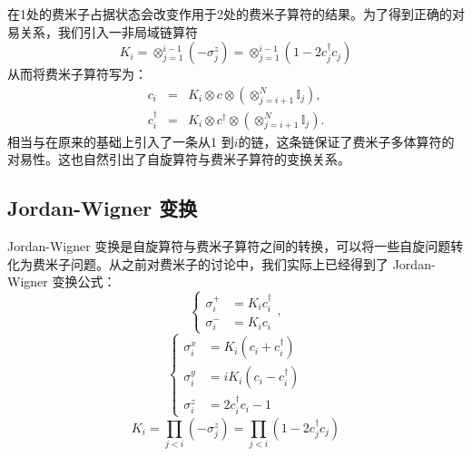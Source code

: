 \documentclass[10pt,UTF8]{ctexart}
\begin{document}
在1处的费米子占据状态会改变作用于2处的费米子算符的结果。为了得到正确的对易关系，我们引入一非局域链算符
\begin{equation}
	K_{i}=\otimes_{j=1}^{i-1}\left(-\sigma_{j}^{z}\right)=\otimes_{j=1}^{i-1}\left(1-2c_{j}^{\dagger}c_{j}\right) 
\end{equation}
从而将费米子算符写为：
\begin{eqnarray}
	c_{i}&=&K_{i}\otimes c\otimes\left(\otimes_{j=i+1}^{N}\mathbb{I}_{j}\right), \\
	c_{i}^{\dagger}&=&K_{i}\otimes c^{\dagger}\otimes\left(\otimes_{j=i+1}^{N}\mathbb{I}_{j}\right).
\end{eqnarray}
相当与在原来的基础上引入了一条从1 到$i$的链，这条链保证了费米子多体算符的对易性。这也自然引出了自旋算符与费米子算符的变换关系。

\subsection*{Jordan-Wigner 变换}
\noindent Jordan-Wigner 变换是自旋算符与费米子算符之间的转换，可以将一些自旋问题转化为费米子问题。从之前对费米子的讨论中，我们实际上已经得到了 Jordan-Wigner 变换公式：
\begin{equation}
	\begin{cases} \sigma_{i}^{+} & =K_{i}c_{i}^{\dagger}\\ \sigma_{i}^{-} & =K_{i}c_{i} \end{cases},
\end{equation}
\begin{equation}
	\begin{cases} \sigma_{i}^{x} & =K_{i}\left(c_{i}+c_{i}^{\dagger}\right)\\ \sigma_{i}^{y} & =iK_{i}\left(c_{i}-c_{i}^{\dagger}\right)\\ \sigma_{i}^{z} & =2c_{i}^{\dagger}c_{i}-1 \end{cases}
\end{equation}
\begin{equation}
	K_{i}=\prod_{j<i}\left(-\sigma_{j}^{z}\right)=\prod_{j<i}\left(1-2c_{j}^{\dagger}c_{j}\right)
\end{equation}
\end{document}
